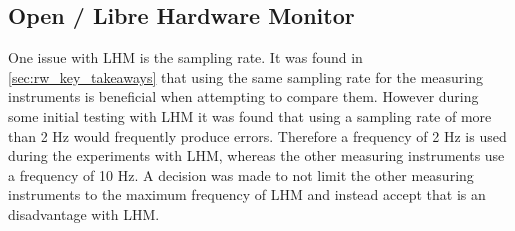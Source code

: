 
\subsection{Open / Libre Hardware Monitor}
One issue with LHM is the sampling rate. It was found in \cref{sec:rw_key_takeaways} that using the same sampling rate for the measuring instruments is beneficial when attempting to compare them. However during some initial testing with LHM it was found that using a sampling rate of more than 2 Hz would frequently produce errors. Therefore a frequency of 2 Hz is used during the experiments with LHM, whereas the other measuring instruments use a frequency of 10 Hz. A decision was made to not limit the other measuring instruments to the maximum frequency of LHM and instead accept that is an disadvantage with LHM.